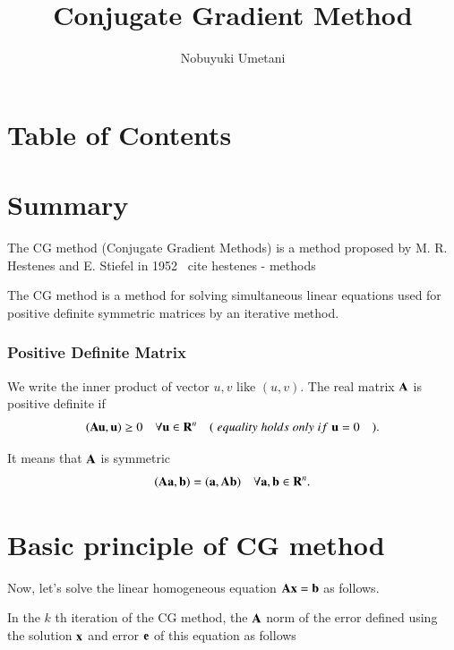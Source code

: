 



\title{Conjugate Gradient Method}
\author{Nobuyuki Umetani}

\maketitle
\tableofcontents




\section{Table of Contents}


\section{Summary}

The CG method (Conjugate Gradient Methods) is a method proposed by M. R. Hestenes and E. Stiefel in 1952 \ cite {hestenes - methods}

The CG method is a method for solving simultaneous linear equations used for positive definite symmetric matrices by an iterative method.


\subsubsection{Positive Definite Matrix}


We write the inner product of vector $u,v$ like $(u,v)$.
%
The real matrix $\mathbf{A}$ is positive definite if 
%
\begin{equation}
(\mathbf{A}\mathbf{u},\mathbf{u})\ge0 \quad \forall\mathbf{u}\in\mathbf{R}^n \quad (\;equality\;holds\;only\;if\;\mathbf{u}=0 \quad ).
\end{equation}


It means that $\mathbf{A}$ is symmetric
%
\begin{equation}
(\mathbf{A}\mathbf{a},\mathbf{b})=(\mathbf{a},\mathbf{A}\mathbf{b}) \quad \forall\mathbf{a},\mathbf{b}\in\mathbf{R}^n.
\end{equation}
%


\section{Basic principle of CG method}


Now, let's solve the linear homogeneous equation $\mathbf{A}\mathbf{x}=\mathbf{b}$ as follows.

In the $k$ th iteration of the CG method, the $\mathbf{A}$ norm of the error defined using the solution $\mathbf{x	}$ and error $\mathbf{e}$ of this equation as follows

